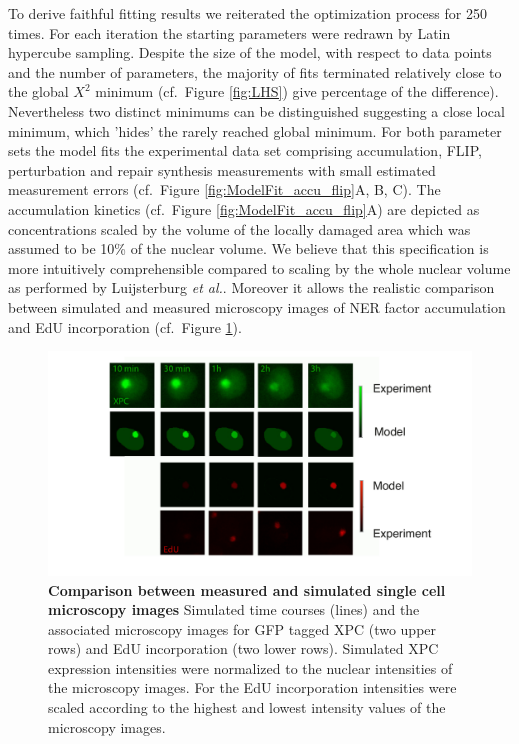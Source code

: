 To derive faithful fitting results we reiterated the optimization process for 250 times. For each iteration the starting parameters were redrawn by Latin hypercube sampling. Despite the size of the model, with respect to data points and the number of parameters, the majority of fits terminated relatively close to the global $X^2$ minimum (cf.\ Figure \ref{fig:LHS}) give percentage of the difference). Nevertheless two distinct minimums can be distinguished suggesting a close local minimum, which 'hides' the rarely reached global minimum. For both parameter sets the model fits the experimental data set comprising accumulation, FLIP, perturbation and repair synthesis measurements with small estimated measurement errors (cf.\ Figure \ref{fig:ModelFit_accu_flip}A, B, C). The accumulation kinetics (cf.\ Figure \ref{fig:ModelFit_accu_flip}A) are depicted as concentrations scaled by the volume of the locally damaged area which was assumed to be 10\% of the nuclear volume. We believe that this specification is more intuitively comprehensible  compared to scaling by the whole nuclear volume as performed by Luijsterburg \textit{et al.}\cite{Luijsterburg2010}. Moreover it allows the realistic comparison between simulated and measured microscopy images of NER factor accumulation and EdU incorporation (cf.\ Figure \ref{fig:Fitt_accu_Mic}).  

\begin{figure}[htbp]
\begin{center}
\includegraphics[width=1\textwidth]{Abbildungen/figure2_6_2.pdf}
\caption{\textbf{Comparison between measured and simulated single cell microscopy images} Simulated time courses (lines) and the associated microscopy images for GFP tagged XPC (two upper rows) and EdU incorporation (two lower rows). Simulated XPC expression intensities were normalized to the nuclear intensities of the microscopy images. For the EdU incorporation intensities were scaled according to the highest and lowest intensity values of the microscopy images.}
\label{fig:Fitt_accu_Mic}
\end{center}
\end{figure}

